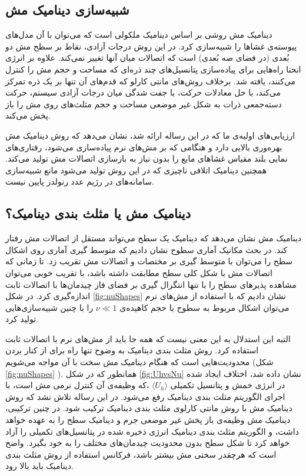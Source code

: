 \subsection{
شبیه‌سازی دینامیک مش
}
دینامیک مش روشی بر اساس دینامیک ملکولی است که می‌توان با آن مدل‌های پیوسته‌ی غشا‌ها را شبیه‌سازی کرد. در این روش درجات آزادی، نقاط بر سطح مش دو بُعدی (در فضای صه بُعدی) است که اتصالات میان آنها تغییر نمی‌کند. علاوه بر انرژی انحنا راه‌هایی برای پیاده‌سازی پتانسیل‌های چند ذره‌ای که مساحت و حجم مش را کنترل می‌کنند، یافته شد. برخلاف روش‌های مانتی کارلو که قدم‌های آن تنها بر یک ذره تمرکز می‌کند، با حل معادلات حرکت، با جفت شدگی میان درجات آزادی سیستم، حرکت دسته‌جمعی ذرات به شکل غیر موضعی مساحت‌ و حجم‌ مثلث‌های روی مش را باز پخش می‌کند.

ارزیابی‌های اولیه‌ی ما که در این رساله ارائه شد، نشان می‌دهد که روش دینامیک مش بهره‌وری بالایی دارد و هنگامی که بر مش‌های نرم پیاده‌سازی می‌شود، رفتاری‌های نمایی بلند مقیاس غشا‌های مایع را بدون نیاز به بازسازی اتصالات مش تولید می‌کند. همچنین دینامیک اتلافی ناچیزی که در این روش تولید می‌شود مانع شبیه‌سازی سامانه‌های در رژیم عدد رنولدز پایین نیست.

\subsection{
دینامیک مش یا مثلث بندی دینامیک؟
}
دینامیک مش نشان می‌دهد که دینامیک یک سطح می‌تواند مستقل از اتصالات مش رفتار کند. در بحث مکانیک آماری سطوح نشان دادیم که متوسط گیری آماری روی اشکال سطح را می‌توان با متوسط گیری بر مختصات و اتصالات مش تقریب زد. تا زمانی که اتصالات مش با شکل کلی سطح مطابقت داشته باشد، با تقریب خوبی می‌توان مشاهده پذیر‌های سطح را با تنها انتگرال ‌گیری بر فضای فاز چیدمان‌ها با اتصالات ثابت اندازه‌گیری کرد. در شکل
\ref{fig:nuShapes}
نشان دادیم که با استفاده از مش‌های نرم می‌توان اشکال مربوط به سطوح با حجم کاهیده‌ی
$\nu\ll1$
را با چنین شبیه‌سازی‌هایی تولید کرد.

التبه این استدلال به این معنی نیست که همه جا باید از مش‌های نرم با اتصالات ثابت استفاده کرد. روش مثلث بندی دینامیک
\cite{BoalPRA1992, Gompper1992Science}
به وضوح تنها راه برای از کنار بردن محدودیت‌هایی است که هنگام دینامیک مش سخت با آن مواجه می‌شویم (شکل
\ref{fig:nuShapes}
). همانطور که در شکل
\ref{fig:UhvsNu}
نشان داده شد، اختلاف ایجاد شده در انرژی خمش و پتانسیل تکمیلی
 $\langle U_h\rangle$
،که وظیفه‌ی آن کنترل نرمی مش است، با اجرای الگوریتم مثلث بندی دینامیک  رفع می‌شود. در این رساله تلاش نشد که روش دینامیک مش با روش مانتی کارلوی مثلث بندی دینامیک ترکیب شود. در چنین ترکیبی، دینامیک مش وظیفه‌ی باز پخش غیر موضعی جرم و دینامیک سطح را به عهده خواهد داشت، و الگوریتم مثلث بندی دینامیک انرژی ذخیره شده در پتانسیل‌های تکمیلی را آزاد خواهد کرد تا شکل سطح بدون محدودیت چیدمان‌های مختلف را به خود بگیرد. واضح است که هرچقدر سختی مش بیشتر باشد، فرکانس استفاده از روش مثلث بندی دینامیک  باید بالا رود.


